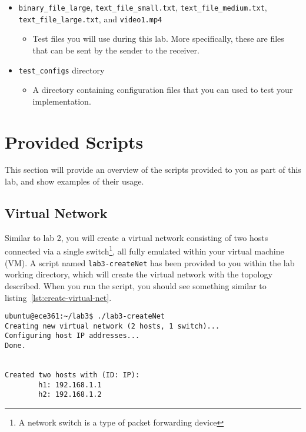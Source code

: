 \documentclass[11pt]{article}
\begin{document}
\begin{itemize}
    \item \texttt{binary\_file\_large},  \texttt{text\_file\_small.txt}, \texttt{text\_file\_medium.txt}, \texttt{text\_file\_large.txt}, and \texttt{video1.mp4}
        \begin{itemize}
            \item Test files you will use during this lab. More specifically, these are files that can be sent by the sender to the receiver.
        \end{itemize}

    \item \texttt{test\_configs} directory
        \begin{itemize}
            \item A directory containing configuration files that you can used to test your implementation.
        \end{itemize}

\end{itemize}


\section{Provided Scripts}
\label{sec:provided-scripts}
This section will provide an overview of the scripts provided to you as part of this lab, and show examples of their usage.

\subsection{Virtual Network}
Similar to lab 2, you will create a virtual network consisting of two hosts connected via a single switch\footnote{A network switch is a type of packet forwarding device}, all fully emulated within your virtual machine (VM).
A script named \texttt{lab3-createNet} has been provided to you within the lab working directory, which will create the virtual network with the topology described.
When you run the script, you should see something similar to listing~\ref{lst:create-virtual-net}.

\begin{lstlisting}[style=ece361shell, caption={Creating the virtual network.}, label={lst:create-virtual-net}]
ubuntu@ece361:~/lab3$ ./lab3-createNet
Creating new virtual network (2 hosts, 1 switch)...
Configuring host IP addresses...
Done.


Created two hosts with (ID: IP):
        h1: 192.168.1.1
        h2: 192.168.1.2

\end{lstlisting}
\end{document}
